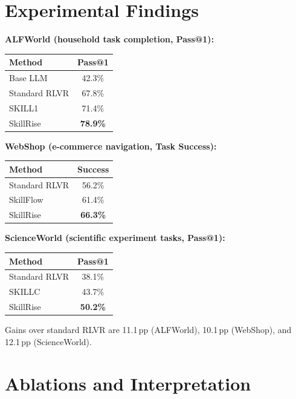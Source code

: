 \documentclass[10pt,twocolumn]{article}
\begin{document}
\section{Experimental Findings}

\textbf{ALFWorld (household task completion, Pass@1):}

\begin{center}\small
\begin{tabular}{lc}
\toprule
Method & Pass@1 \\
\midrule
Base LLM & 42.3\% \\
Standard RLVR & 67.8\% \\
SKILL1 & 71.4\% \\
SkillRise & \textbf{78.9\%} \\
\bottomrule
\end{tabular}
\end{center}

\textbf{WebShop (e-commerce navigation, Task Success):}

\begin{center}\small
\begin{tabular}{lc}
\toprule
Method & Success \\
\midrule
Standard RLVR & 56.2\% \\
SkillFlow & 61.4\% \\
SkillRise & \textbf{66.3\%} \\
\bottomrule
\end{tabular}
\end{center}

\textbf{ScienceWorld (scientific experiment tasks, Pass@1):}

\begin{center}\small
\begin{tabular}{lc}
\toprule
Method & Pass@1 \\
\midrule
Standard RLVR & 38.1\% \\
SKILLC & 43.7\% \\
SkillRise & \textbf{50.2\%} \\
\bottomrule
\end{tabular}
\end{center}

Gains over standard RLVR are 11.1\,pp (ALFWorld), 10.1\,pp (WebShop),
and 12.1\,pp (ScienceWorld).

\section{Ablations and Interpretation}
\end{document}
